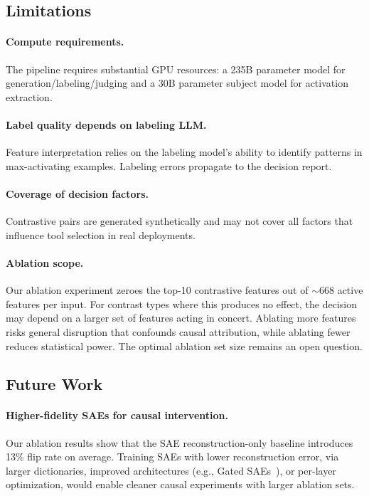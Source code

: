 \documentclass[runningheads]{llncs}
\begin{document}
\subsection{Limitations}

\paragraph{Compute requirements.} The pipeline requires substantial GPU resources: a 235B parameter model for generation/labeling/judging and a 30B parameter subject model for activation extraction.

\paragraph{Label quality depends on labeling LLM.} Feature interpretation relies on the labeling model's ability to identify patterns in max-activating examples. Labeling errors propagate to the decision report.

\paragraph{Coverage of decision factors.} Contrastive pairs are generated synthetically and may not cover all factors that influence tool selection in real deployments.

\paragraph{Ablation scope.} Our ablation experiment zeroes the top-10 contrastive features out of ${\sim}668$ active features per input. For contrast types where this produces no effect, the decision may depend on a larger set of features acting in concert. Ablating more features risks general disruption that confounds causal attribution, while ablating fewer reduces statistical power. The optimal ablation set size remains an open question.

\subsection{Future Work}

\paragraph{Higher-fidelity SAEs for causal intervention.} Our ablation results show that the SAE reconstruction-only baseline introduces 13\% flip rate on average. Training SAEs with lower reconstruction error, via larger dictionaries, improved architectures (e.g., Gated SAEs~\cite{rajamanoharan2024improvingdictionarylearninggated}), or per-layer optimization, would enable cleaner causal experiments with larger ablation sets.
\end{document}
